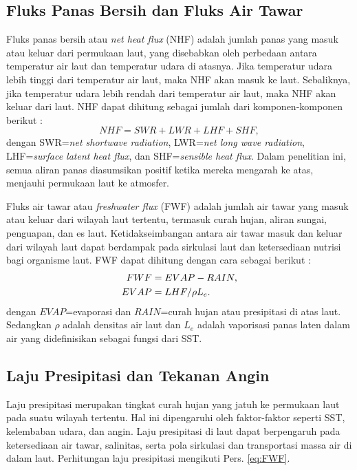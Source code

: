 \begin{spacing}{1.5}
	\subsection[Fluks Panas Bersih dan Fluks Air Tawar]{Fluks Panas Bersih dan Fluks Air Tawar}
	
	Fluks panas bersih atau \textit{net heat flux} (NHF) adalah jumlah panas yang masuk atau keluar dari permukaan laut, yang disebabkan oleh perbedaan antara temperatur air laut dan temperatur udara di atasnya. Jika temperatur udara lebih tinggi dari temperatur air laut, maka NHF akan masuk ke laut. Sebaliknya, jika temperatur udara lebih rendah dari temperatur air laut, maka NHF akan keluar dari laut. NHF dapat dihitung sebagai jumlah dari komponen-komponen berikut \cite{Tomita2021}: 
	\begin{equation}\label{eq:NHF}
		NHF = SWR + LWR + LHF + SHF,
	\end{equation} 
	dengan SWR=\textit{net shortwave radiation}, LWR=\textit{net long wave radiation}, LHF=\textit{surface latent heat flux}, dan SHF=\textit{sensible heat flux}. Dalam penelitian ini, semua aliran panas diasumsikan positif ketika mereka mengarah ke atas, menjauhi permukaan laut ke atmosfer.
	
	Fluks air tawar atau \textit{freshwater flux} (FWF) adalah jumlah air tawar yang masuk atau keluar dari wilayah laut tertentu, termasuk curah hujan, aliran sungai, penguapan, dan es laut. Ketidakseimbangan antara air tawar masuk dan keluar dari wilayah laut dapat berdampak pada sirkulasi laut dan ketersediaan nutrisi bagi organisme laut. FWF dapat dihitung dengan cara sebagai berikut \cite{Tomita2019}:
	\begin{equation}\label{eq:FWF}\\
		\begin{aligned}
		FWF &= EVAP-RAIN, \\
		EVAP &= LHF/{\rho L_e}.
		\end{aligned}
	\end{equation} 
	dengan $EVAP$=evaporasi dan $RAIN$=curah hujan atau presipitasi di atas laut. Sedangkan $\rho$ adalah densitas air laut dan $L_e$ adalah  vaporisasi panas laten dalam air yang didefinisikan sebagai fungsi dari SST.
	\subsection[Laju Presipitasi dan Tekanan Angin]{Laju Presipitasi dan Tekanan Angin}
	Laju presipitasi merupakan tingkat curah hujan yang jatuh ke permukaan laut pada suatu wilayah tertentu. Hal ini dipengaruhi oleh faktor-faktor seperti SST, kelembaban udara, dan angin. Laju presipitasi di laut dapat berpengaruh pada ketersediaan air tawar, salinitas, serta pola sirkulasi dan transportasi massa air di dalam laut. Perhitungan laju presipitasi mengikuti Pers. \ref{eq:FWF}. 
	

\end{spacing}
